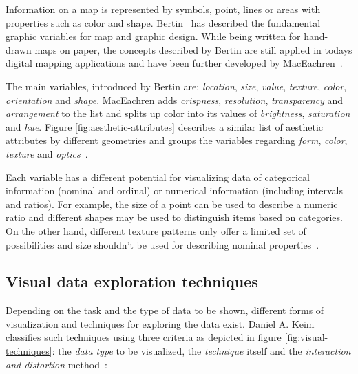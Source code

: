 Information on a map is represented by symbols, point, lines or areas with properties such as color and shape. Bertin~\cite{bertin67graphics, bertin83graphics} has described the fundamental graphic variables for map and graphic design. While being written for hand-drawn maps on paper, the concepts described by Bertin are still applied in todays digital mapping applications and have been further developed by MacEachren~\cite{MacEachren95maps}.

The main variables, introduced by Bertin are: \textit{location}, \textit{size}, \textit{value}, \textit{texture}, \textit{color}, \textit{orientation} and \textit{shape}. MacEachren adds \textit{crispness}, \textit{resolution}, \textit{transparency} and \textit{arrangement} to the list and splits up color into its values of \textit{brightness}, \textit{saturation} and \textit{hue}. Figure \ref{fig:aesthetic-attributes} describes a similar list of aesthetic attributes by different geometries and groups the variables regarding \textit{form}, \textit{color}, \textit{texture} and \textit{optics}~\cite{Wilkinson05grammar}.

Each variable has a different potential for visualizing data of categorical information (nominal and ordinal) or numerical information (including intervals and ratios). For example, the size of a point can be used to describe a numeric ratio and different shapes may be used to distinguish items based on categories. On the other hand, different texture patterns only offer a limited set of possibilities and size shouldn't be used for describing nominal properties~\cite{noellenburg11geovis, MacEachren95maps}. 

\subsection{Visual data exploration techniques}
\label{vis-data-techniques}

Depending on the task and the type of data to be shown, different forms of visualization and techniques for exploring the data exist. Daniel A. Keim~\cite{keim2001vis} classifies such techniques using three criteria as depicted in figure \ref{fig:visual-techniques}: the \textit{data type} to be visualized, the \textit{technique} itself and the \textit{interaction and distortion} method~\cite{Delort10vis}:

